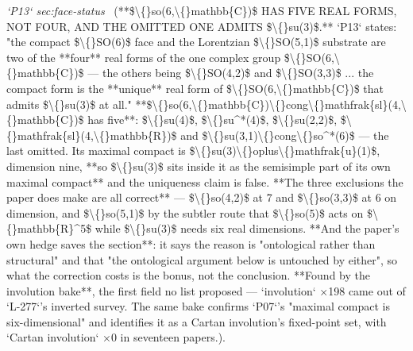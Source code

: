 \begin{description}
\textit{`P13` sec:face-status} \ (**\$\textbackslash\{\}so(6,\textbackslash\{\}mathbb\{C\})\$ HAS FIVE REAL FORMS, NOT FOUR, AND THE OMITTED ONE ADMITS \$\textbackslash\{\}su(3)\$.** `P13` states: "the compact \$\textbackslash\{\}SO(6)\$ face and the Lorentzian \$\textbackslash\{\}SO(5,1)\$ substrate are two of the **four** real forms of the one complex group \$\textbackslash\{\}SO(6,\textbackslash\{\}mathbb\{C\})\$ --- the others being \$\textbackslash\{\}SO(4,2)\$ and \$\textbackslash\{\}SO(3,3)\$ ... the compact form is the **unique** real form of \$\textbackslash\{\}SO(6,\textbackslash\{\}mathbb\{C\})\$ that admits \$\textbackslash\{\}su(3)\$ at all." **\$\textbackslash\{\}so(6,\textbackslash\{\}mathbb\{C\})\textbackslash\{\}cong\textbackslash\{\}mathfrak\{sl\}(4,\textbackslash\{\}mathbb\{C\})\$ has five**: \$\textbackslash\{\}su(4)\$, \$\textbackslash\{\}su\textasciicircum{}*(4)\$, \$\textbackslash\{\}su(2,2)\$, \$\textbackslash\{\}mathfrak\{sl\}(4,\textbackslash\{\}mathbb\{R\})\$ and \$\textbackslash\{\}su(3,1)\textbackslash\{\}cong\textbackslash\{\}so\textasciicircum{}*(6)\$ --- the last omitted. Its maximal compact is \$\textbackslash\{\}su(3)\textbackslash\{\}oplus\textbackslash\{\}mathfrak\{u\}(1)\$, dimension nine, **so \$\textbackslash\{\}su(3)\$ sits inside it as the semisimple part of its own maximal compact** and the uniqueness claim is false. **The three exclusions the paper does make are all correct** --- \$\textbackslash\{\}so(4,2)\$ at 7 and \$\textbackslash\{\}so(3,3)\$ at 6 on dimension, and \$\textbackslash\{\}so(5,1)\$ by the subtler route that \$\textbackslash\{\}so(5)\$ acts on \$\textbackslash\{\}mathbb\{R\}\textasciicircum{}5\$ while \$\textbackslash\{\}su(3)\$ needs six real dimensions. **And the paper's own hedge saves the section**: it says the reason is "ontological rather than structural" and that "the ontological argument below is untouched by either", so what the correction costs is the bonus, not the conclusion. **Found by the involution bake**, the first field no list proposed --- `involution` \ensuremath{\times}198 came out of `L-277`'s inverted survey. The same bake confirms `P07`'s "maximal compact is six-dimensional" and identifies it as a Cartan involution's fixed-point set, with `Cartan involution` \ensuremath{\times}0 in seventeen papers.). 

\end{description}
